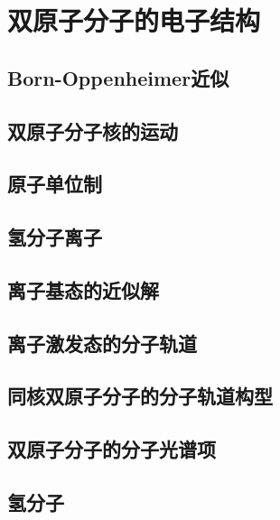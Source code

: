 \chapter{双原子分子的电子结构}
\label{chap:13}
\section{Born-Oppenheimer近似}
\label{sec:13.1 The Born-Oppenheimer Approximation}

\section{双原子分子核的运动}
\label{sec:13.2 Nuclear Motion in Diatomic Molecules}

\section{原子单位制}
\label{sec:13.3 Atomic Units}

\section{氢分子离子}
\label{sec:13.4 The Hydrogen Molecular Ion}

\section{离子基态的近似解}
\label{sec:13.5 Approximate Treatments of the H2 Ground Electronic State}

\section{离子激发态的分子轨道}
\label{sec:13.6 Molecular Orbitals for H2 Excited States}

\section{同核双原子分子的分子轨道构型}
\label{sec:13.7 MO Configurations for Homonuclear Diatomic Molecules}

\section{双原子分子的分子光谱项}
\label{sec:13.8 Electronic Terms of Diatomic Molecules}

\section{氢分子}
\label{sec:13.9 The Hydrogen Molecule}

